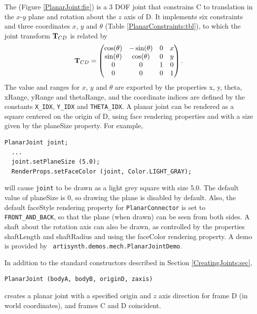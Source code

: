 The  
(Figure \ref{PlanarJoint:fig}) is a 3 DOF
joint that constrains C to translation in the $x$-$y$ plane 
and rotation about the $z$ axis of D.  It implements six
constraints and three coordinates $x$, $y$ and $\theta$
(Table \ref{PlanarConstraints:tbl}), to which the joint transform
${\bf T}_{CD}$ is related by
%
\begin{equation*}
{\bf T}_{CD} = \left(\begin{matrix}
\cos(\theta) & -\sin(\theta) & 0 & x \\
\sin(\theta) &  \cos(\theta) & 0 & y \\
0 & 0 & 1 & 0 \\
0 & 0 & 0 & 1 
\end{matrix}\right).
\end{equation*}
The value and ranges for $x$, $y$ and $\theta$ are exported by the
properties {\sf x}, {\sf y}, {\sf theta}, {\sf xRange}, {\sf yRange}
and {\sf thetaRange}, and the coordinate indices are defined by the
constants {\tt X\_IDX}, {\tt Y\_IDX} and {\tt THETA\_IDX}.  
A planar joint can be rendered as a square centered on the origin
of D, using face rendering properties and with a size given by the
{\sf planeSize} property. For example,
%
\begin{lstlisting}[]
  PlanarJoint joint;
  ...
  joint.setPlaneSize (5.0);
  RenderProps.setFaceColor (joint, Color.LIGHT_GRAY);
\end{lstlisting}
%
will cause {\tt joint} to be drawn as a light grey square with size
5.0. The default value of {\sf planeSize} is 0, so drawing the plane
is disabled by default. Also, the default {\sf faceStyle} rendering
property for {\tt PlanarConnector} is set to {\tt FRONT\_AND\_BACK},
so that the plane (when drawn) can be seen from both sides.  A shaft
about the rotation axis can also be drawn, as controlled by the
properties {\sf shaftLength} and {\sf shaftRadius} and using the {\sf
faceColor} rendering property.  A demo is provided by {\tt
artisynth.demos.mech.PlanarJointDemo}.

In addition to the standard constructors described in
Section \ref{CreatingJoints:sec},
%
\begin{lstlisting}[]
  PlanarJoint (bodyA, bodyB, originD, zaxis)
\end{lstlisting}
%
creates a planar joint with a specified origin and $z$ axis direction
for frame D (in world coordinates), and frames C and D coincident.

